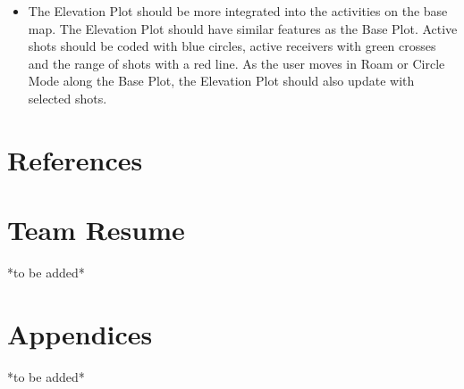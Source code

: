 \documentclass[12pt]{article}
\begin{document}
\begin{itemize}
\item The Elevation Plot should be more integrated into the activities on the base map. The Elevation Plot should have similar features as the Base Plot. Active shots should be coded with blue circles, active receivers with green crosses and the range of shots with a red line. As the user moves in Roam or Circle Mode along the Base Plot, the Elevation Plot should also update with selected shots.
\end{itemize}

\newpage
\section{References}

\printbibliography

\newpage
\section{Team Resume}

*to be added*

%

\newpage
\section{Appendices}

*to be added*
\end{document}
